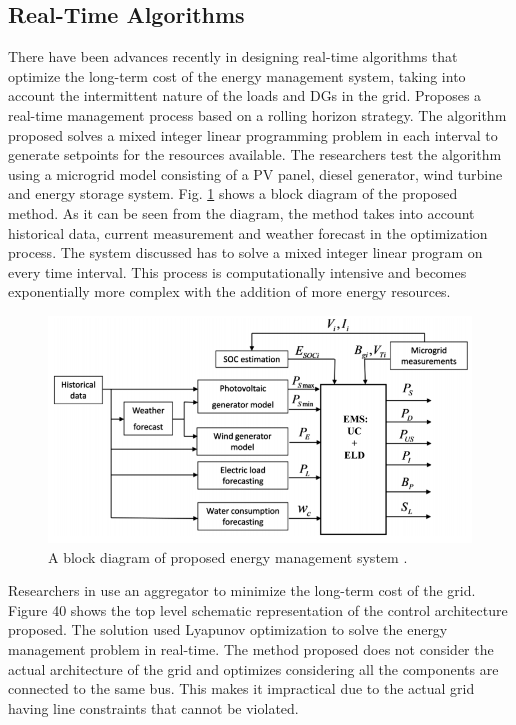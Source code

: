 \subsection{Real-Time Algorithms}
There have been advances recently in designing real-time algorithms that optimize the long-term cost of the energy management system, taking into account the intermittent nature of the loads and DGs in the grid. \cite{RPa13} Proposes a real-time management process based on a rolling horizon strategy. The algorithm proposed solves a mixed integer linear programming problem in each interval to generate setpoints for the resources available. The researchers test the algorithm using a microgrid model consisting of a PV panel, diesel generator, wind turbine and energy storage system. Fig. \ref{fig:RT_1} shows a block diagram of the proposed method. As it can be seen from the diagram, the method takes into account historical data, current measurement and weather forecast in the optimization process. The system discussed has to solve a mixed integer linear program on every time interval. This process is computationally intensive and becomes exponentially more complex with the addition of more energy resources.
\begin{figure}[!h]
\centering
\includegraphics[width=0.85\linewidth]{figs/RT_1.png}
\caption[A block diagram of proposed energy management system]{A block diagram of proposed energy management system  \cite{RPa13}.}
\label{fig:RT_1}
\end{figure}

 Researchers in \cite{Sun14} use an aggregator to minimize the long-term cost of the grid. Figure 40 shows the top level schematic representation of the control architecture proposed. The solution used Lyapunov optimization to solve the energy management problem in real-time. The method proposed does not consider the actual architecture of the grid and optimizes considering all the components are connected to the same bus. This makes it impractical due to the actual grid having line constraints that cannot be violated.

